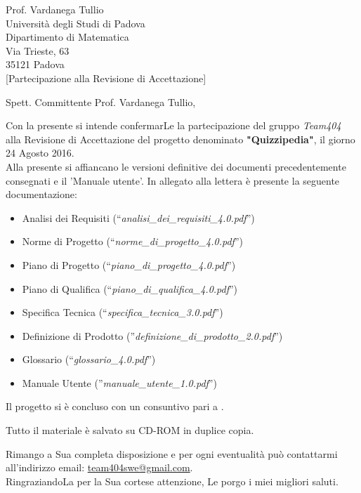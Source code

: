 \documentclass[boldsubject,shortindent,a4paper,11pt]{letteracdp}
\date{23 Agosto 2016}
\begin{document}
\begin{letter}{	Prof. Vardanega Tullio \\
				Universit\`a degli Studi di Padova \\
				Dipartimento di Matematica \\
				Via Trieste, 63 \\
				35121 Padova\\
				}
[Partecipazione alla Revisione di Accettazione]
\opening{Spett. Committente Prof. Vardanega Tullio,}
\noindent
Con la presente si intende confermarLe la partecipazione del gruppo \emph{Team404} alla Revisione di Accettazione del progetto denominato \textbf{"Quizzipedia"}, il giorno 24 Agosto 2016.
\\
\noindent
Alla presente si affiancano le versioni definitive dei documenti precedentemente consegnati e il 'Manuale utente'.
\newline
\noindent
In allegato alla lettera è presente la seguente documentazione:
\begin{itemize}
	\item Analisi dei Requisiti (``\textit{analisi\_dei\_requisiti\_4.0.pdf}'')
	\item Norme di Progetto (``\textit{norme\_di\_progetto\_4.0.pdf}'')
	\item Piano di Progetto (``\textit{piano\_di\_progetto\_4.0.pdf}'')
	\item Piano di Qualifica (``\textit{piano\_di\_qualifica\_4.0.pdf}'')
	\item Specifica Tecnica (``\textit{specifica\_tecnica\_3.0.pdf}'')
	\item Definizione di Prodotto (''\textit{definizione\_di\_prodotto\_2.0.pdf}'')
	\item Glossario (``\textit{glossario\_4.0.pdf}'')
	\item Manuale Utente (''\textit{manuale\_utente\_1.0.pdf}'')
\end{itemize}

\noindent
Il progetto si è concluso con un consuntivo pari a .

\noindent
Tutto il materiale è salvato su CD-ROM in duplice copia.


\closing{Rimango a Sua completa disposizione e per ogni eventualit\`a pu\`o contattarmi all'indirizzo email: \url{team404swe@gmail.com}.\\RingraziandoLa per la Sua cortese attenzione, Le porgo i miei migliori saluti.}
\end{letter}
\end{document}
